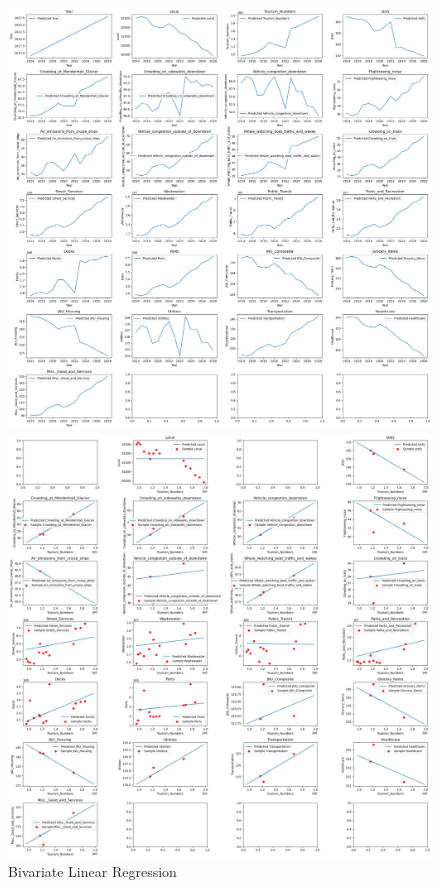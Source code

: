 \begin{figure}[htbp]
    \centering
    \begin{minipage}[t]{0.49\textwidth}
        \centering
        \includegraphics[width=1\textwidth]{2dLinear_1.jpg} %
    \end{minipage}
    \hfill
    \begin{minipage}[t]{0.49\textwidth}
        \centering
        \includegraphics[width=1\textwidth]{2dLinear_2.jpg} %
\end{minipage}
\caption{Bivariate Linear Regression}
\end{figure}

